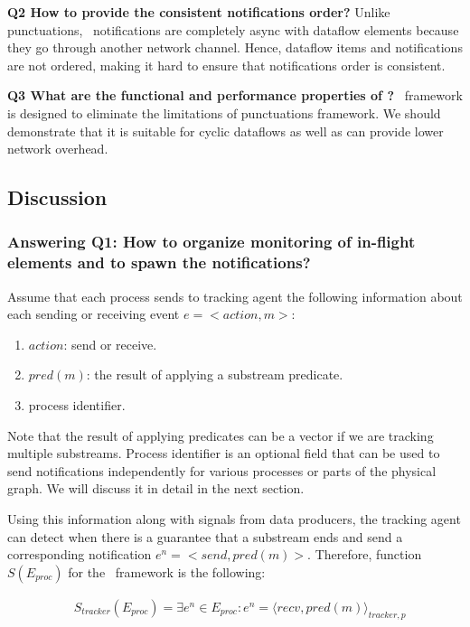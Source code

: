{\bf Q2 How to provide the consistent notifications order?} Unlike punctuations, \tracker\ notifications are completely async with dataflow elements because they go through another network channel. Hence, dataflow items and notifications are not ordered, making it hard to ensure that notifications order is consistent.

{\bf Q3 What are the functional and performance properties of \tracker?} \tracker\ framework is designed to eliminate the limitations of punctuations framework. We should demonstrate that it is suitable for cyclic dataflows as well as can provide lower network overhead.

\subsection{Discussion}

\subsubsection{Answering Q1: How to organize monitoring of in-flight elements and to spawn the notifications?}
Assume that each process sends to tracking agent the following information about each sending or receiving event $e = <action,m>$:
\begin{enumerate}
    \item $action$: send or receive.
    \item $pred(m)$: the result of applying a substream predicate.
    \item process identifier.
\end{enumerate}

Note that the result of applying predicates can be a vector if we are tracking multiple substreams. Process identifier is an optional field that can be used to send notifications independently for various processes or parts of the physical graph. We will discuss it in detail in the next section.

Using this information along with signals from data producers, the tracking agent can detect when there is a guarantee that a substream ends and send a corresponding notification $e^{n} = <send,pred(m)>$. Therefore, function $S(E_{proc})$ for the \tracker\ framework is the following:

\begin{align*}
& S_{tracker}(E_{proc}) = \exists e^{n} \in E_{proc} : e^{n} = \langle recv,pred(m)\rangle_{tracker,p}
\end{align*}

